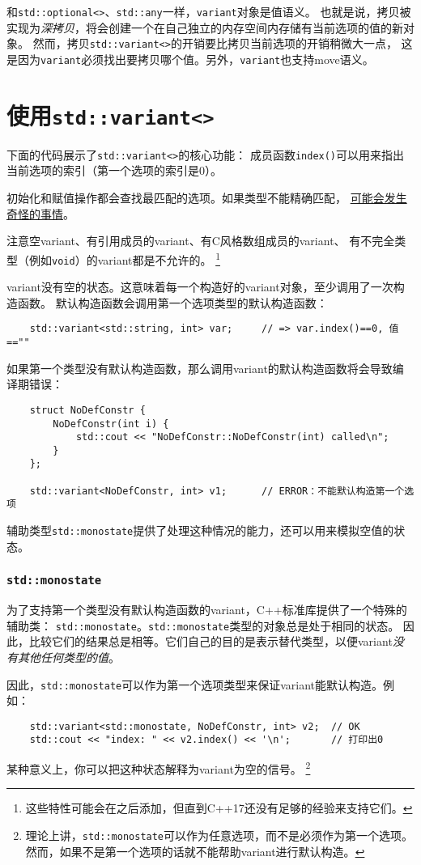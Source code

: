 和\texttt{std::optional<>}、\texttt{std::any}一样，\texttt{variant}对象是值语义。
也就是说，拷贝被实现为\emph{深拷贝}，将会创建一个在自己独立的内存空间内存储有当前选项的值的新对象。
然而，拷贝\texttt{std::variant<>}的开销要比拷贝当前选项的开销稍微大一点，
这是因为\texttt{variant}必须找出要拷贝哪个值。另外，\texttt{variant}也支持move语义。


\section{使用\texttt{std::variant<>}}
下面的代码展示了\texttt{std::variant<>}的核心功能：
成员函数\texttt{index()}可以用来指出当前选项的索引（第一个选项的索引是0）。

初始化和赋值操作都会查找最匹配的选项。如果类型不能精确匹配，
\hyperref[ch16.5]{可能会发生奇怪的事情}。

注意空variant、有引用成员的variant、有C风格数组成员的variant、
有不完全类型（例如\texttt{void}）的variant都是不允许的。
\footnote{这些特性可能会在之后添加，但直到C++17还没有足够的经验来支持它们。}

variant没有空的状态。这意味着每一个构造好的variant对象，至少调用了一次构造函数。
默认构造函数会调用第一个选项类型的默认构造函数：
\begin{lstlisting}
    std::variant<std::string, int> var;     // => var.index()==0, 值==""
\end{lstlisting}
如果第一个类型没有默认构造函数，那么调用variant的默认构造函数将会导致编译期错误：
\begin{lstlisting}
    struct NoDefConstr {
        NoDefConstr(int i) {
            std::cout << "NoDefConstr::NoDefConstr(int) called\n";
        }
    };

    std::variant<NoDefConstr, int> v1;      // ERROR：不能默认构造第一个选项
\end{lstlisting}
辅助类型\texttt{std::monostate}提供了处理这种情况的能力，还可以用来模拟空值的状态。

\subsubsection{\texttt{std::monostate}}\label{ch16.2.1}
为了支持第一个类型没有默认构造函数的variant，C++标准库提供了一个特殊的辅助类：
\texttt{std::monostate}。\texttt{std::monostate}类型的对象总是处于相同的状态。
因此，比较它们的结果总是相等。它们自己的目的是表示替代类型，以便variant\emph{没有其他任何类型的值}。

因此，\texttt{std::monostate}可以作为第一个选项类型来保证variant能默认构造。例如：
\begin{lstlisting}
    std::variant<std::monostate, NoDefConstr, int> v2;  // OK
    std::cout << "index: " << v2.index() << '\n';       // 打印出0
\end{lstlisting}
某种意义上，你可以把这种状态解释为variant为空的信号。
\footnote{理论上讲，\texttt{std::monostate}可以作为任意选项，而不是必须作为第一个选项。
然而，如果不是第一个选项的话就不能帮助variant进行默认构造。}

